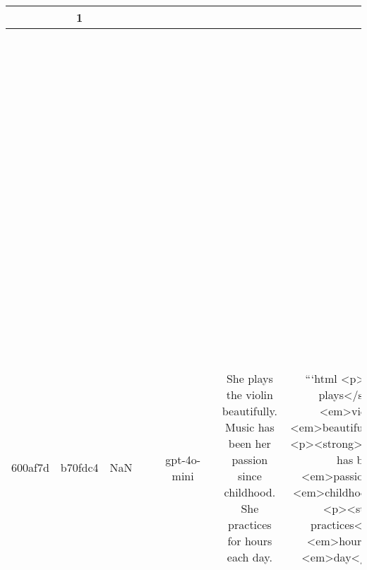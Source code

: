 \begin{table}[h!]
\begin{tabular}{|c|c|c|c|c|c|c|c|c|c|}
{{ERR & 1\\
\hline
600af7d & b70fdc4 & NaN &  & gpt-4o-mini & She plays the violin beautifully. Music has been her passion since childhood. She practices for hours each day. & ```html
<p><strong>She plays</strong> the <em>violin</em> <em>beautifully</em>.</p>
<p><strong>Music</strong> has been her <em>passion</em> since <em>childhood</em>.</p>
<p><strong>She practices</strong> for <em>hours</em> each <em>day</em>.</p>
``` & ok & The chatbot output includes three <p> tags, which fulfills the requirement for at least three <p> tags. Each <p> tag contains one <strong> tag, which is in compliance with the requirement to add one <strong> tag inside each <p> tag. Furthermore, each <p> tag also contains multiple <em> tags, adhering to the guideline of including multiple <em> tags to emphasize key words and phrases.

Since these requirements are clearly met with no violations in the given output, the output complies with the description provided.

No violation.
OK & 1\\
\hline
600af7d & b70fdc4 & NaN &  & gemma2:9b & She plays the violin beautifully. Music has been her passion since childhood. She practices for hours each day. & <p><strong>She</strong> <em>plays</em> the <em>violin</em> <strong>beautifully</strong>.</p>

<p><strong>Music</strong> has been her <em>passion</em> <em>since</em> <em>childhood</em>.</p>

<p><strong>She</strong> <em>practices</em> for <em>hours</em> <em>each day</em>.</p>  


 & ok & The output consists of three paragraphs, as seen by the presence of three separate `<p>` tags, which satisfies the requirement for at least three `<p>` tags. Within each `<p>` tag, there is a `<strong>` tag, fulfilling the requirement to add at least one `<strong>` tag within each paragraph. Additionally, multiple `<em>` tags are present in each paragraph to emphasize key words and phrases, meeting the specification regarding the use of `<em>` tags. 

Given the presence of the required number of paragraphs, and the inclusion of both `<strong>` and `<em>` tags within each paragraph, the output complies with the instructions described in the chatbot description. Therefore, there are no violations detected in this case.

}}
\end{tabular}
\end{table}
